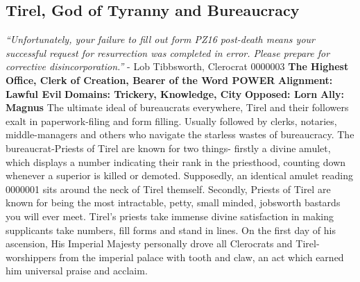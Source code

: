 \subsection{Tirel, God of Tyranny and Bureaucracy}\label{god:tirel}
\textit{“Unfortunately, your failure to fill out form PZ16 post-death means your successful request for resurrection was completed in error. Please prepare for corrective disincorporation.”}
\break
\hspace*{\fill}- Lob Tibbsworth, Clerocrat 0000003 
\break
\break
\textbf{The Highest Office, Clerk of Creation, Bearer of the Word POWER}\break
\hspace*{\fill}\break
\textbf{Alignment:\hspace*{\fill} Lawful Evil} \break
\textbf{Domains:\hspace*{\fill} Trickery, Knowledge, City} \break
\textbf{Opposed:\hspace*{\fill} Lorn} \break
\textbf{Ally:\hspace*{\fill} Magnus} \break
\hspace*{\fill}\break
The ultimate ideal of bureaucrats everywhere, Tirel and their followers exalt in paperwork-filing and form filling. Usually followed by clerks, notaries, middle-managers and others who navigate the starless wastes of bureaucracy. \newline
The bureaucrat-Priests of Tirel are known for two things- firstly a divine amulet, which displays a number indicating their rank in the priesthood, counting down whenever a superior is killed or demoted. Supposedly, an identical amulet reading 0000001 sits around the neck of Tirel themself.\newline
Secondly, Priests of Tirel are known for being the most intractable, petty, small minded, jobsworth bastards you will ever meet. Tirel’s priests take immense divine satisfaction in making supplicants take numbers, fill forms and stand in lines.  On the first day of his ascension, His Imperial Majesty personally drove all Clerocrats and Tirel-worshippers from the imperial palace with tooth and claw, an act which earned him universal praise and acclaim. 

